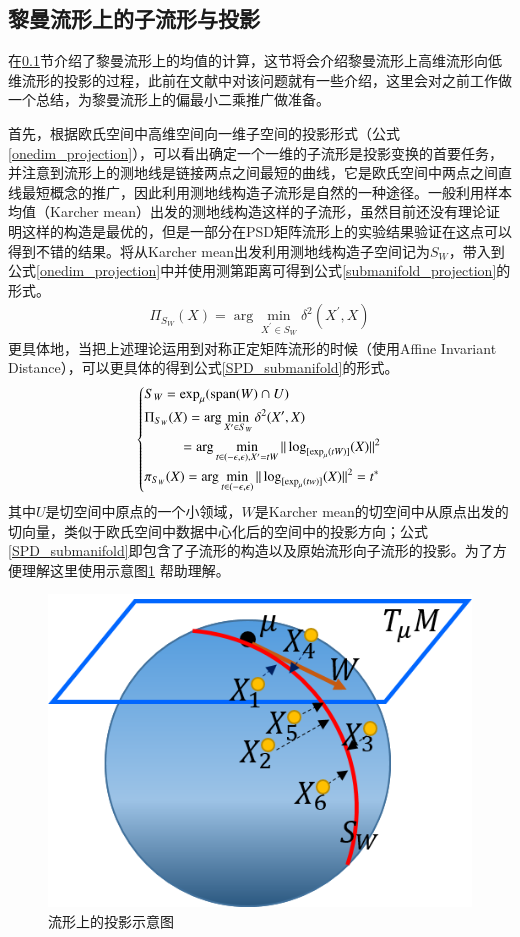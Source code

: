 \subsection{黎曼流形上的子流形与投影}
\label{sec:riemannian_mean}
在\ref{sec:riemannian_mean}节介绍了黎曼流形上的均值的计算，这节将会介绍黎曼流形上高维流形向低维流形的投影的过程，此前在文献\cite{PGA,RCCA}中对该问题就有一些介绍，这里会对之前工作做一个总结，为黎曼流形上的偏最小二乘推广做准备。

首先，根据欧氏空间中高维空间向一维子空间的投影形式（公式\ref{onedim_projection}），可以看出确定一个一维的子流形是投影变换的首要任务，并注意到流形上的测地线是链接两点之间最短的曲线，它是欧氏空间中两点之间直线最短概念的推广，因此利用测地线构造子流形是自然的一种途径。一般利用样本均值（Karcher mean）出发的测地线构造这样的子流形，虽然目前还没有理论证明这样的构造是最优的，但是一部分在PSD矩阵流形上的实验结果验证在这点可以得到不错的结果\cite{RegionCov_pedestrain}。将从Karcher mean出发利用测地线构造子空间记为$S_W$，带入到公式\ref{onedim_projection}中并使用测第距离可得到公式\ref{submanifold_projection}的形式。
\begin{equation}
\label{submanifold_projection}
\begin{split}
\Pi_{S_W}(X)=\arg\min_{X^{\prime} \in S_W}\delta^{2}(X^{\prime},X)
\end{split}
\end{equation}
更具体地，当把上述理论运用到对称正定矩阵流形的时候（使用Affine Invariant Distance\cite{AIM_metric}），可以更具体的得到公式\ref{SPD_submanifold}的形式。
\begin{equation}
\label{SPD_submanifold}
\left\{
\begin{split}
\begin{aligned}
&S_W=\exp_\mu({\rm{span}}(W)\cap U)\\
&\Pi_{S_W}(X)=\arg\min_{X^{\prime} \in S_W}\delta^{2}(X^{\prime},X)\\
&~~~~~~~~~~=\arg\min_{t \in (-\epsilon,\epsilon),X^{\prime}=tW}\|\log_{[\exp_{\mu}(tW)]}(X)\|^2\\
&\pi_{S_W}(X)=\arg\min_{t \in (-\epsilon,\epsilon)}\|\log_{[\exp_{\mu}(tw)]}(X)\|^2=t^{*}
\end{aligned}
\end{split}
\right.
\end{equation}
其中$U$是切空间中原点的一个小领域，$W$是Karcher mean的切空间中从原点出发的切向量，类似于欧氏空间中数据中心化后的空间中的投影方向；公式\ref{SPD_submanifold}即包含了子流形的构造以及原始流形向子流形的投影。为了方便理解这里使用示意图\ref{fig:SPD_SubManifold}
帮助理解。
\begin{figure}
	\centering
	\includegraphics[width=0.5\linewidth]{source/SPD_submanifold.png}
	\caption{流形上的投影示意图}
	\label{fig:SPD_SubManifold}
\end{figure}
